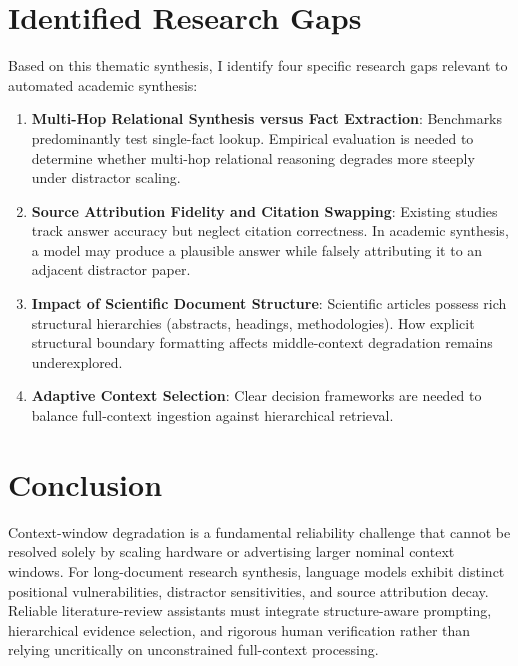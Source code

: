 \documentclass[manuscript,screen,oneside]{acmart}
\begin{document}
\section{Identified Research Gaps}\label{sec:gaps}
Based on this thematic synthesis, I identify four specific research gaps relevant to automated academic synthesis:
\begin{enumerate}
    \item \textbf{Multi-Hop Relational Synthesis versus Fact Extraction}: Benchmarks predominantly test single-fact lookup. Empirical evaluation is needed to determine whether multi-hop relational reasoning degrades more steeply under distractor scaling.
    \item \textbf{Source Attribution Fidelity and Citation Swapping}: Existing studies track answer accuracy but neglect citation correctness. In academic synthesis, a model may produce a plausible answer while falsely attributing it to an adjacent distractor paper.
    \item \textbf{Impact of Scientific Document Structure}: Scientific articles possess rich structural hierarchies (abstracts, headings, methodologies). How explicit structural boundary formatting affects middle-context degradation remains underexplored.
    \item \textbf{Adaptive Context Selection}: Clear decision frameworks are needed to balance full-context ingestion against hierarchical retrieval.
\end{enumerate}

\section{Conclusion}\label{sec:conclusion}
Context-window degradation is a fundamental reliability challenge that cannot be resolved solely by scaling hardware or advertising larger nominal context windows. For long-document research synthesis, language models exhibit distinct positional vulnerabilities, distractor sensitivities, and source attribution decay. Reliable literature-review assistants must integrate structure-aware prompting, hierarchical evidence selection, and rigorous human verification rather than relying uncritically on unconstrained full-context processing.



\end{document}
